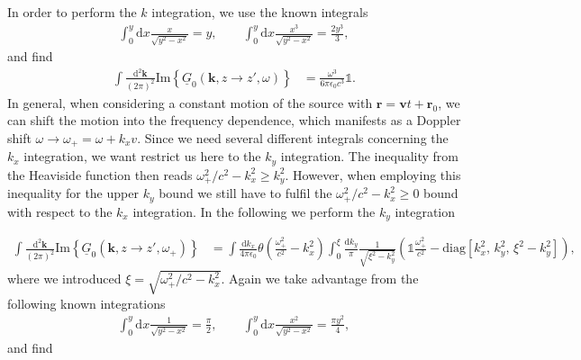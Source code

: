 \documentclass[11pt]{article}
\newcommand{\vv}[1]{\mathbf{#1}}
\newcommand{\dd}[0]{\mathrm{d}}
\begin{document}
%
In order to perform the $k$ integration, we use the known integrals
\begin{align}
  \int_0^y \dd x \frac{x}{\sqrt{y^2-x^2}}=y,
 \quad \quad
  \int_0^y \dd x \frac{x^3}{\sqrt{y^2-x^2}}=\frac{2y^3}{3},
  \end{align}
  and find
\begin{align}
  \int \frac{\dd^2\vv k}{(2\pi)^2}
  \mathrm{Im}\left\{\underline{G}_0(\vv k, z\to z',\omega)\right\} &=
     \frac{\omega^3}{6\pi\epsilon_0 c^3}
     \mathbb{1}
     .
\end{align}
In general, when considering a constant motion of the source with $\vv r = \vv v t +\vv r_0$, we can shift the motion into the frequency dependence, which manifests as a Doppler shift $\omega\to\omega_+=\omega+k_x v$. Since we need several different integrals concerning the $k_x$ integration, we want restrict us here to the $k_y$ integration. The inequality from the Heaviside function then reads $\omega_+^2/c^2-k_x^2\geq k_y^2$. However, when employing this inequality for the upper $k_y$ bound we still have to fulfil the $\omega_+^2/c^2-k_x^2\geq 0$ bound with respect to the $k_x$ integration. In the following we perform the $k_y$ integration

\begin{align}
  \int\frac{\dd^2\vv k}{(2\pi)^2}  \mathrm{Im}\left\{\underline{G}_0(\vv k, z\to z',\omega_+)\right\} &=
  \int\frac{\dd k_x}{4\pi\epsilon_0}
  \theta(\frac{\omega_+^2}{c^2}-k_x^2)
  \int_0^{\xi} \frac{\dd k_y}{\pi}
  \frac{1
}{\sqrt{\xi^2-k_y^2}}
  \left(
  \mathbb{1}\frac{\omega_+^2}{c^2} -
    \mathrm{diag}\left[
      k_x^2,\,k_y^2,\,\xi^2-k_y^2
    \right]
  \right)
  ,
\end{align}
where we introduced $\xi=\sqrt{\omega_+^2/c^2-k_x^2}$. Again we take advantage from the following known integrations
\begin{align}
  \int_0^y \dd x \frac{1}{\sqrt{y^2-x^2}}=\frac{\pi}{2},
 \quad \quad
  \int_0^y \dd x \frac{x^2}{\sqrt{y^2-x^2}}=\frac{\pi y^2}{4},
  \end{align}
  and find
\end{document}

